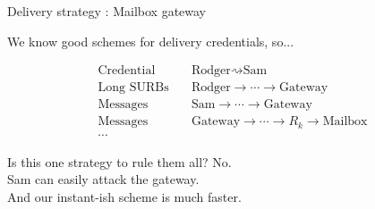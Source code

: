 \begin{frame}[t]{Delivery strategy : Mailbox gateway}

We know good schemes for delivery credentials, so...

\[ \begin{aligned}
\textrm{Credential}\quad & \textrm{Rodger} \rightsquigarrow \textrm{Sam} \\
\textrm{Long SURBs}\quad & \textrm{Rodger} \to \cdots \to \textrm{Gateway} \\
\textrm{Messages}\quad & \textrm{Sam} \to \cdots \to \textrm{Gateway} \\
\textrm{Messages}\quad & \textrm{Gateway} \to \cdots \to R_k \to \textrm{Mailbox} \\
 \cdots
\end{aligned} \]

\bigskip
Is this one strategy to rule them all?  No. \\
 \hspace*{2pt} Sam can easily attack the gateway. \\
 \hspace*{2pt} And our instant-ish scheme is much faster.

\end{frame}
\begin{comment}
like 
\begin{itemize}
\item Single-use HMAC tokens to limit Sam's message sending, 
\item BBS or VLR group signatures for unlimited messages,
\item or nothing to allow a public contact point.
\end{itemize}
\end{comment}


